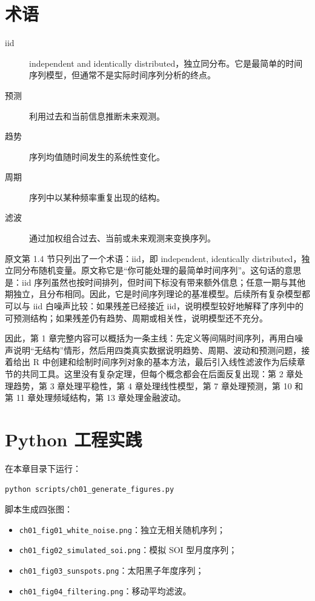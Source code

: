 \documentclass[11pt,a4paper]{ctexart}
\begin{document}
\section{术语}

\begin{description}
  \item[iid] independent and identically distributed，独立同分布。它是最简单的时间序列模型，但通常不是实际时间序列分析的终点。
  \item[预测] 利用过去和当前信息推断未来观测。
  \item[趋势] 序列均值随时间发生的系统性变化。
  \item[周期] 序列中以某种频率重复出现的结构。
  \item[滤波] 通过加权组合过去、当前或未来观测来变换序列。
\end{description}

原文第 1.4 节只列出了一个术语：iid，即 independent, identically distributed，独立同分布随机变量。原文称它是“你可能处理的最简单时间序列”。这句话的意思是：iid 序列虽然也按时间排列，但时间下标没有带来额外信息；任意一期与其他期独立，且分布相同。因此，它是时间序列理论的基准模型。后续所有复杂模型都可以与 iid 白噪声比较：如果残差已经接近 iid，说明模型较好地解释了序列中的可预测结构；如果残差仍有趋势、周期或相关性，说明模型还不充分。

因此，第 1 章完整内容可以概括为一条主线：先定义等间隔时间序列，再用白噪声说明“无结构”情形，然后用四类真实数据说明趋势、周期、波动和预测问题，接着给出 R 中创建和绘制时间序列对象的基本方法，最后引入线性滤波作为后续章节的共同工具。这里没有复杂定理，但每个概念都会在后面反复出现：第 2 章处理趋势，第 3 章处理平稳性，第 4 章处理线性模型，第 7 章处理预测，第 10 和第 11 章处理频域结构，第 13 章处理金融波动。

\section{Python 工程实践}

在本章目录下运行：
\begin{lstlisting}[language=bash]
python scripts/ch01_generate_figures.py
\end{lstlisting}

脚本生成四张图：
\begin{itemize}
  \item \texttt{ch01\_fig01\_white\_noise.png}：独立无相关随机序列；
  \item \texttt{ch01\_fig02\_simulated\_soi.png}：模拟 SOI 型月度序列；
  \item \texttt{ch01\_fig03\_sunspots.png}：太阳黑子年度序列；
  \item \texttt{ch01\_fig04\_filtering.png}：移动平均滤波。
\end{itemize}
\end{document}

